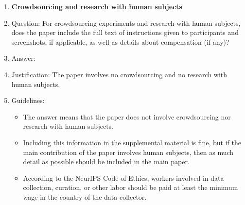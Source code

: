 \begin{enumerate}
\item {\bf Crowdsourcing and research with human subjects}
    \item[] Question: For crowdsourcing experiments and research with human subjects, does the paper include the full text of instructions given to participants and screenshots, if applicable, as well as details about compensation (if any)? 
    \item[] Answer: \answerNA{} %
    \item[] Justification: The paper involves no crowdsourcing and no research with human subjects.
    \item[] Guidelines:
    \begin{itemize}
        \item The answer \answerNA{} means that the paper does not involve crowdsourcing nor research with human subjects.
        \item Including this information in the supplemental material is fine, but if the main contribution of the paper involves human subjects, then as much detail as possible should be included in the main paper. 
        \item According to the NeurIPS Code of Ethics, workers involved in data collection, curation, or other labor should be paid at least the minimum wage in the country of the data collector. 
    \end{itemize}


\end{enumerate}
